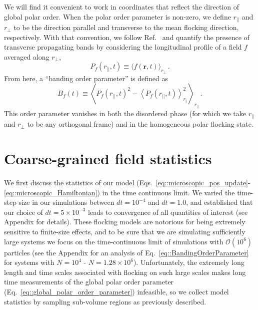 \documentclass[twoside,twocolumn,9pt]{article}
\begin{document}
We will find it convenient to work in coordinates that reflect the direction of global polar order. When the polar order parameter is non-zero, we define $r_{||}$ and $r_{\perp}$ to be the direction parallel and transverse to the mean flocking direction, respectively.
With that convention, we follow Ref.~\cite{chate2008collective} and quantify the presence of transverse propagating bands by considering the longitudinal profile of a field $f$ averaged along $r_{\perp}$,
\begin{equation}
\label{eq::BandingProfile}
P_{f}(r_{||},t) \equiv \langle{f}(\mathbf{r},t)\rangle_{r_{\perp}}\,.
\end{equation}
From here, a ``banding order parameter'' is defined as
\begin{equation}
\label{eq::BandingOrderParameter}
B_{f}(t) \equiv \left\langle{P}_{f}(r_{||},t)^{2}-\left\langle{P}_{f}(r_{||},t)\right\rangle_{r_{||}}^{2}\right\rangle_{r_{||}}\,.
\end{equation}
This order parameter vanishes in both the disordered phase (for which we take $r_{||}$ and $r_{\perp}$ to be any orthogonal frame) and in the homogeneous polar flocking state.

\section{Coarse-grained field statistics}
\label{sec::CoarseGrainedFieldStatistics}

We first discuss the statistics of our model (Eqs.~\ref{eq::microscopic_pos_update}-\ref{eq::microscopic_Hamiltonian}) in the time continuous limit.
We varied the time-step size in our simulations between $dt=10^{-4}$ and $dt =1.0$, and established that our choice of $dt = 5\times 10^{-3}$ leads to convergence of all quantities of interest (see Appendix for details). These flocking models are notorious for being extremely sensitive to finite-size effects, and to be sure that we are simulating sufficiently large systems we focus on the time-continuous limit of simulations with $\mathcal{O}(10^6)$ particles (see the Appendix for an analysis of Eq.~\ref{eq::BandingOrderParameter} for systems with $N=10^4$ - $N=1.28\times 10^6$). Unfortunately, the extremely long length and time scales associated with flocking on such large scales makes long time measurements of the global polar order parameter (Eq.~\ref{eq::global_polar_order_parameter}) infeasible, so we collect model statistics by sampling sub-volume regions as previously described.
\end{document}
